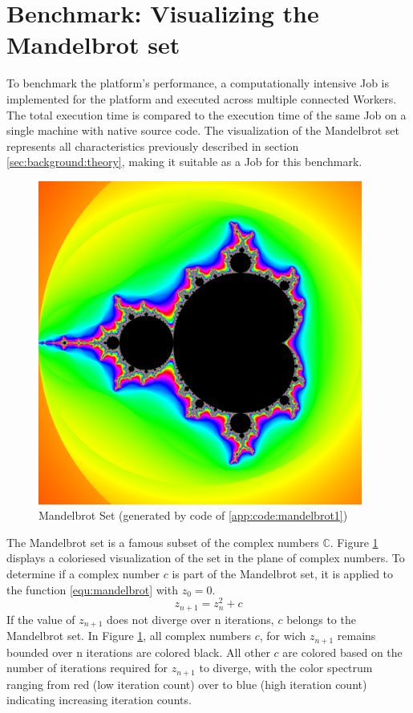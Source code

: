 \section{Benchmark: Visualizing the Mandelbrot set}
\label{sec:methodology:benchmark}
To benchmark the platform's performance, a computationally intensive Job is implemented for the platform and executed across multiple connected Workers. The total execution time is compared to the execution time of the same Job on a single machine with native source code. The visualization of the Mandelbrot set represents all characteristics previously described in section \ref{sec:background:theory}, making it suitable as a Job for this benchmark.
\begin{figure}[htbp]
  \centering
  \includegraphics[width=0.95\textwidth]{gfx/figures/mandelbrot.png}
  \caption{Mandelbrot Set (generated by code of \ref{app:code:mandelbrot1})}
  \label{fig:methodology:mandelbrot}
\end{figure}
The Mandelbrot set is a famous subset of the complex numbers $\mathbb{C}$. Figure \ref{fig:methodology:mandelbrot} displays a coloriesed visualization of the set in the plane of complex numbers. To determine if a complex number $c$ is part of the Mandelbrot set, it is applied to the function \ref{equ:mandelbrot} with $z_{0}=0$.
\begin{equation}
  z_{n+1} = z_{n}^2 + c
  \label{equ:mandelbrot}
\end{equation}
If the value of $z_{n+1}$ does not diverge over n iterations, $c$ belongs to the Mandelbrot set. In Figure \ref{fig:methodology:mandelbrot}, all complex numbers $c$, for wich $z_{n+1}$ remains bounded over n iterations are colored black. All other $c$ are colored based on the number of iterations required for $z_{n+1}$ to diverge, with the color spectrum ranging from red (low iteration count) over to blue (high iteration count) indicating increasing iteration counts.

